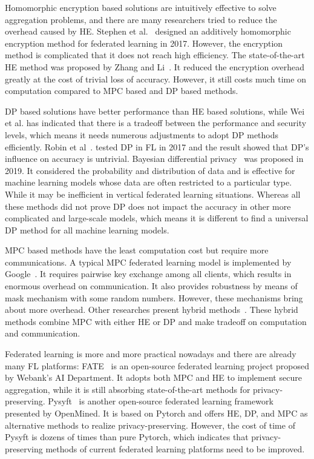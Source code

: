 Homomorphic encryption based solutions are intuitively effective to solve aggregation problems, and there are many researchers tried to reduce the overhead caused by HE. Stephen et al.~\cite{abs-1711-10677} designed an additively homomorphic encryption method for federated learning in 2017. However, the encryption method is complicated that it does not reach high efficiency. The state-of-the-art HE method was proposed by Zhang and Li~\cite{BatchCrypt}. It reduced the encryption overhead greatly at the cost of trivial loss of accuracy. However, it still costs much time on computation compared to MPC based and DP based methods.

DP based solutions have better performance than HE based solutions, while Wei et al.\cite{DPAnalysis} has indicated that there is a tradeoff between the performance and security levels, which means it needs numerous adjustments to adopt DP methods efficiently. Robin et al~\cite{geyer2017differentially}. tested DP in FL in 2017 and the result showed that DP's influence on accuracy is untrivial. Bayesian differential privacy~\cite{Bayesian} was proposed in 2019. It considered the probability and distribution of data and is effective for machine learning models whose data are often restricted to a particular type. While it may be inefficient in vertical federated learning situations. Whereas all these methods did not prove DP does not impact the accuracy in other more complicated and large-scale models, which means it is different to find a universal DP method for all machine learning models.

MPC based methods have the least computation cost but require more communications. A typical MPC federated learning model is implemented by Google~\cite{Practical}. It requires pairwise key exchange among all clients, which results in enormous overhead on communication. It also provides robustness by means of mask mechanism with some random numbers. However, these mechanisms bring about more overhead. Other researches present hybrid methods~\cite{Hybrid,HybridAlpha}. These hybrid methods combine MPC with either HE or DP and make tradeoff on computation and communication.

Federated learning is more and more practical nowadays and there are already many FL platforms: FATE~\cite{fate} is an open-source federated learning project proposed by Webank’s AI Department. It adopts both MPC and HE to implement secure aggregation, while it is still absorbing state-of-the-art methods for privacy-preserving. Pysyft~\cite{pysyft} is another open-source federated learning framework presented by OpenMined. It is based on Pytorch and offers HE, DP, and MPC as alternative methods to realize privacy-preserving. However, the cost of time of Pysyft is dozens of times than pure Pytorch, which indicates that privacy-preserving methods of current federated learning platforms need to be improved.
